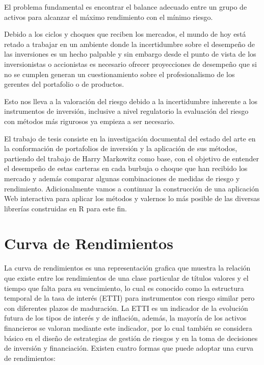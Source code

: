 \documentclass[
  12pt,
]{krantz}
\begin{document}
El problema fundamental es encontrar el balance adecuado entre un grupo de activos para alcanzar el máximo rendimiento con el mínimo riesgo.

Debido a los ciclos y choques que reciben los mercados, el mundo de hoy está retado a trabajar en un ambiente donde la incertidumbre sobre el desempeño de las inversiones es un hecho palpable y sin embargo desde el punto de vista de los inversionistas o accionistas es necesario ofrecer proyecciones de desempeño que si no se cumplen generan un cuestionamiento sobre el profesionalismo de los gerentes del portafolio o de productos.

Esto nos lleva a la valoración del riesgo debido a la incertidumbre inherente a los instrumentos de inversión, inclusive a nivel regulatorio la evaluación del riesgo con métodos más rigurosos ya empieza a ser necesario.

El trabajo de tesis consiste en la investigación documental del estado del arte en la conformación de portafolios de inversión y la aplicación de sus métodos, partiendo del trabajo de Harry Markowitz como base, con el objetivo de entender el desempeño de estas carteras en cada burbuja o choque que han recibido los mercado y además comparar algunas combinaciones de medidas de riesgo y rendimiento. Adicionalmente vamos a continuar la construcción de una aplicación Web interactiva para aplicar los métodos y valernos lo más posible de las diversas librerías construidas en R para este fin.

\mainmatter

\hypertarget{curva-de-rendimientos}{%
\chapter{Curva de Rendimientos}\label{curva-de-rendimientos}}

La curva de rendimientos es una representación grafica que muestra la relación que existe entre los rendimientos de una clase particular de títulos valores y el tiempo que falta para su vencimiento, lo cual es conocido como la estructura temporal de la tasa de interés (ETTI) para instrumentos con riesgo similar pero con diferentes plazos de maduración. La ETTI es un indicador de la evolución futura de los tipos de interés y de inflación, además, la mayoría de los activos financieros se valoran mediante este indicador, por lo cual también se considera básico en el diseño de estrategias de gestión de riesgos y en la toma de decisiones de inversión y financiación. Existen cuatro formas que puede adoptar una curva de rendimientos:
\end{document}
